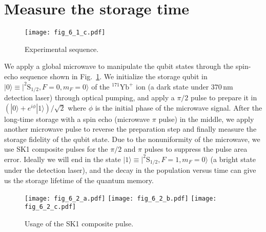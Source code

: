 \section{Measure the storage time}

\begin{figure}
    \centering
    \texttt{[image: fig\_6\_1\_c.pdf]}
    \caption{Experimental sequence.}
    \label{fig:6_1_c}
\end{figure}

We apply a global microwave to manipulate the qubit states through the spin-echo sequence shown in Fig.~\ref{fig:6_1_c}. We initialize the storage qubit in $|0\rangle \equiv |^{2}\mathrm{S}_{1/2},F=0,m_F=0\rangle$ of the $^{171}\mathrm{Yb}^+$ ion (a dark state under $370\,$nm detection laser) through optical pumping, and apply a $\pi/2$ pulse to prepare it in $(|0\rangle+e^{i\phi}|1\rangle)/\sqrt{2}$ where $\phi$ is the initial phase of the microwave signal. After the long-time storage with a spin echo (microwave $\pi$ pulse) in the middle, we apply another microwave pulse to reverse the preparation step and finally measure the storage fidelity of the qubit state. Due to the nonuniformity of the microwave, we use SK1 composite pulses \cite{RN274,RN275,RN272,RN273} for the $\pi/2$ and $\pi$ pulses to suppress the pulse area error. Ideally we will end in the state $|1\rangle \equiv |^{2}\mathrm{S}_{1/2},F=1,m_F=0\rangle$ (a bright state under the detection laser), and the decay in the population versus time can give us the storage lifetime of the quantum memory.

\begin{figure}
    \centering
    {\texttt{[image: fig\_6\_2\_a.pdf]}}
    {\texttt{[image: fig\_6\_2\_b.pdf]}}
    {\texttt{[image: fig\_6\_2\_c.pdf]}}
    \caption{Usage of the SK1 composite pulse.}
    \label{fig:6_2}
\end{figure}

